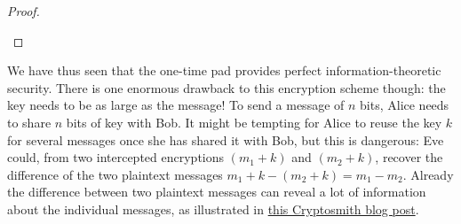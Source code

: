 \begin{proof}
\begin{center}
\end{center}


\end{proof}
We have thus seen that the one-time pad provides perfect information-theoretic security. There is one enormous drawback to this encryption scheme though: the key needs to be as large as the message! To send a message of $n$ bits, Alice needs to share $n$ bits of key with Bob. It might be tempting for Alice to reuse the key $k$ for several messages once she has shared it with Bob, but this is dangerous: Eve could, from two intercepted encryptions $(m_1 + k)$ and $(m_2 + k)$, recover the difference of the two plaintext messages $m_1 + k - (m_2 + k) = m_1 - m_2$. Already the difference between two plaintext messages can reveal a lot of information about the individual messages, as illustrated in \href{https://cryptosmith.com/2008/05/31/stream-reuse/}{this Cryptosmith blog post}.


